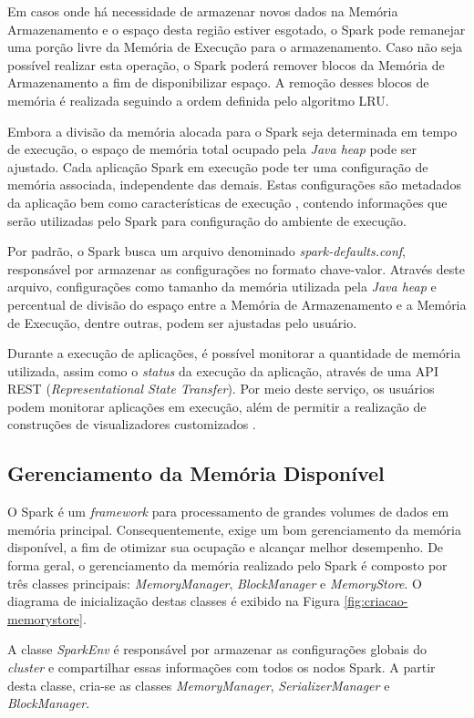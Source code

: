 Em casos onde há necessidade de armazenar novos dados na Memória Armazenamento e o espaço desta região estiver esgotado, o Spark pode remanejar uma porção livre da Memória de Execução para o armazenamento. Caso não seja possível realizar esta operação, o Spark poderá remover blocos da Memória de Armazenamento a fim de disponibilizar espaço. A remoção desses blocos de memória é realizada seguindo a ordem definida pelo algoritmo LRU.

Embora a divisão da memória alocada para o Spark seja determinada em tempo de execução, o espaço de memória total ocupado pela \textit{Java heap} pode ser ajustado. Cada aplicação Spark em execução pode ter uma configuração de memória associada, independente das demais. Estas configurações são metadados da aplicação bem como características de execução \cite{chambers2018spark}, contendo informações que serão utilizadas pelo Spark para configuração do ambiente de execução.

Por padrão, o Spark busca um arquivo denominado \textit{spark-defaults.conf}, responsável por armazenar as configurações no formato chave-valor. Através deste arquivo, configurações como tamanho da memória utilizada pela \textit{Java heap} e percentual de divisão do espaço entre a Memória de Armazenamento e a Memória de Execução, dentre outras, podem ser ajustadas pelo usuário.

Durante a execução de aplicações, é possível monitorar a quantidade de memória utilizada, assim como o \textit{status} da execução da aplicação, através de uma API REST (\textit{Representational State Transfer}). Por meio deste serviço, os usuários podem monitorar aplicações em execução, além de permitir a realização de construções de visualizadores customizados \cite{souravgulati2017}.

\subsection{Gerenciamento da Memória Disponível}
O Spark é um \textit{framework} para processamento de grandes volumes de dados em memória principal. Consequentemente, exige um bom gerenciamento da memória disponível, a fim de otimizar sua ocupação e alcançar melhor desempenho. De forma geral, o gerenciamento da memória realizado pelo Spark é composto por três classes principais: \textit{MemoryManager}, \textit{BlockManager} e \textit{MemoryStore}. O diagrama de inicialização destas classes é exibido na Figura \ref{fig:criacao-memorystore}.

A classe \textit{SparkEnv} é responsável por armazenar as configurações globais do \textit{cluster} e compartilhar essas informações com todos os nodos Spark. A partir desta classe, cria-se as classes \textit{MemoryManager}, \textit{SerializerManager} e \textit{BlockManager}.

